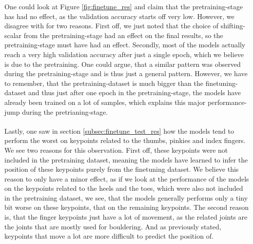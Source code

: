 \documentclass[./main.tex]{subfiles}
\begin{document}
One could look at Figure \ref{fig:finetune_res} and claim that the pretraining-stage has had no effect, as the validation accuracy starts off very low. However, we disagree with for two reasons. First off, we just noted that the choice of shifting-scalar from the pretraining-stage had an effect on the final results, so the pretraining-stage must have had an effect. Secondly, most of the models actually reach a very high validation accuracy after just a single epoch, which we believe is due to the pretraining. One could argue, that a similar pattern was observed during the pretraining-stage and is thus just a general pattern. However, we have to remember, that the pretraining-dataset is much bigger than the finetuning-dataset and thus just after one epoch in the pretraining-stage, the models have already been trained on a lot of samples, which explains this major performance-jump during the pretrianing-stage.
\\
\\
Lastly, one saw in section \ref{subsec:finetune_test_res} how the models tend to perform the worst on keypoints related to the thumbs, pinkies and index fingers. We see two reasons for this observation. First off, these keypoints were not included in the pretraining dataset, meaning the models have learned to infer the position of these keypoints purely from the finetuning dataset. We believe this reason to only have a minor effect, as if we look at the performance of the models on the keypoints related to the heels and the toes, which were also not included in the pretraining dataset, we see, that the models generally performs only a tiny bit worse on these keypoints, that on the remaining keypoints. The second reason is, that the finger keypoints just have a lot of movement, as the related joints are the joints that are mostly used for bouldering. And as previously stated, keypoints that move a lot are more difficult to predict the position of.
\end{document}
